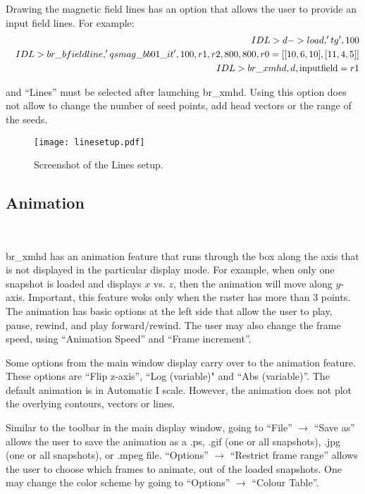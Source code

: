 \documentclass[12pt,preprint]{aastex}
\begin{document}
Drawing the magnetic field lines has an option that allows the user to provide an input field 
lines. For example:
\begin{eqnarray}
&&IDL> d->load,'tg',100\\
&&IDL> br\_bfieldline,'qsmag\_bb01\_it',100,r1,r2,800,800,r0=[[10,6,10],[11,4,5]] \\
&&IDL> br\_xmhd,d,{\rm inputfield}=r1 
\end{eqnarray}

\noindent and ``Lines'' must be selected after launching br\_xmhd. Using this option does not allow
to change the number of seed points, add head vectors or the range of the seeds. 

\begin{wrapfigure}{R}{0.5\textwidth}
\vspace{-1.cm}
\begin{center}
	\texttt{[image: linesetup.pdf]}
\end{center}
\vspace{-0.56cm}
\caption{\label{fig:line} Screenshot of the Lines setup.}
\vspace{-1.cm}
\end{wrapfigure}

\subsection{Animation}~\label{sec:animation}

br\_xmhd has an animation feature that runs through the box along the axis that is not 
displayed in the particular display mode. For example, when only one snapshot is 
loaded and displays $x$ vs. $z$, then the animation will move along $y$-axis. Important, 
this feature woks only when the raster has more than 3 points. 
The animation has basic options at the left side that allow the user to play, pause, rewind, 
and play forward/rewind. The user may also change the frame speed, using ``Animation 
Speed'' and ``Frame increment''. 

Some options from the main window display carry over to the animation feature. These 
options are ``Flip z-axis'',  ``Log (variable)" and ``Abs (variable)''. The default animation 
is in Automatic I scale. However, the animation does not plot the overlying contours, vectors
or lines. 

Similar to the toolbar in the main display window, going to ``File'' $\rightarrow$ ``Save as'' allows the 
user to save the animation as a .ps, .gif (one or all snapshots), .jpg (one or all snapshots), 
or .mpeg file. ``Options'' $\rightarrow$ ``Restrict frame range'' allows the user to choose which frames 
to animate, out of the loaded snapshots. One may change the color scheme by going to 
``Options''  $\rightarrow$ ``Colour Table''.
\end{document}
